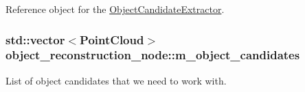 \-Reference object for the \hyperlink{class_object_candidate_extractor}{\-Object\-Candidate\-Extractor}. 

\hypertarget{classobject__reconstruction__node_a1c2d6c9c999230706a087a87aca78cce}{
\subsubsection[{m\-\_\-object\-\_\-candidates}]{\setlength{\rightskip}{0pt plus 5cm}std\-::vector$<${\bf \-Point\-Cloud}$>$ {\bf object\-\_\-reconstruction\-\_\-node\-::m\-\_\-object\-\_\-candidates}}}\label{classobject__reconstruction__node_a1c2d6c9c999230706a087a87aca78cce}


\-List of object candidates that we need to work with. 

